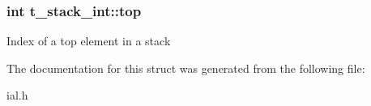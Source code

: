 \subsubsection[{top}]{\setlength{\rightskip}{0pt plus 5cm}int t\+\_\+stack\+\_\+int\+::top}\label{structt__stack__int_abedfedc1347b081f09c7d7ce85e12ab4}
Index of a top element in a stack 

The documentation for this struct was generated from the following file\+:\begin{DoxyCompactItemize}
\item 
ial.\+h\end{DoxyCompactItemize}
